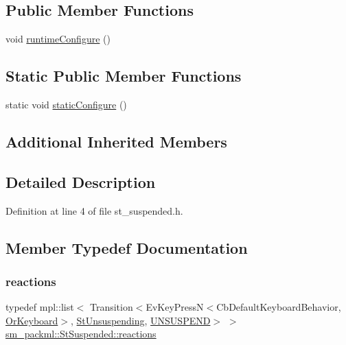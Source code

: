 \subsection*{Public Member Functions}
\begin{DoxyCompactItemize}
\item 
void \hyperlink{structsm__packml_1_1StSuspended_af9c5fd3ed5e46c07d956b40ea0c33bb3}{runtime\+Configure} ()
\end{DoxyCompactItemize}
\subsection*{Static Public Member Functions}
\begin{DoxyCompactItemize}
\item 
static void \hyperlink{structsm__packml_1_1StSuspended_a0da2fc9a8302e89f67aa6b4d7e38a2fd}{static\+Configure} ()
\end{DoxyCompactItemize}
\subsection*{Additional Inherited Members}


\subsection{Detailed Description}


Definition at line 4 of file st\+\_\+suspended.\+h.



\subsection{Member Typedef Documentation}
\mbox{\label{structsm__packml_1_1StSuspended_ac6c9b0d11341ea90eee463202540ceb9}} 
\subsubsection{\texorpdfstring{reactions}{reactions}}
{\footnotesize\ttfamily typedef mpl\+::list$<$ Transition$<$Ev\+Key\+PressN$<$Cb\+Default\+Keyboard\+Behavior, \hyperlink{classsm__packml_1_1OrKeyboard}{Or\+Keyboard}$>$, \hyperlink{structsm__packml_1_1StUnsuspending}{St\+Unsuspending}, \hyperlink{structsm__packml_1_1StSuspended_1_1UNSUSPEND}{U\+N\+S\+U\+S\+P\+E\+ND}$>$ $>$ \hyperlink{structsm__packml_1_1StSuspended_ac6c9b0d11341ea90eee463202540ceb9}{sm\+\_\+packml\+::\+St\+Suspended\+::reactions}}



